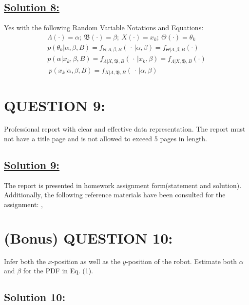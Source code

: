 \documentclass[a4paper,11pt]{article}
\begin{document}
\subsection*{\underline{Solution 8:}}
\label{sec:notation}
Yes with the following Random Variable Notations and Equations: 
 	\begin{eqnarray}
		\Lambda (\cdot) = \alpha;\: \mathfrak{B}(\cdot) = \beta ; \: X(\cdot) = x_k; \: \Theta ( \cdot) = \theta_k \\		
		p(\theta_k | \alpha, \beta, B) = f_{\Theta | \Lambda, \beta, B}(\, \cdot \, | \alpha, \beta) = f_{\Theta | \Lambda, \beta, B}(\cdot)\\
		p(\alpha | x_k, \beta, B) = f_{\Lambda | X, \mathfrak{B}, B}(\, \cdot \, | x_k, \beta) = f_{\Lambda | X, \mathfrak{B}, B}(\cdot) \\\ 
		p(x_k |\alpha, \beta, B) = f_{X | \Lambda, \mathfrak{B}, B}(\, \cdot \, | \alpha, \beta)
	\end{eqnarray}

\section{QUESTION 9:}
Professional report with clear and effective data representation. The report must not have
a title page and is not allowed to exceed 5 pages in length.
\subsection*{\underline{Solution 9:}}
The report is presented in homework assignment form(statement and solution). Additionally, the following reference materials have been consulted for the assignment: \cite{leon2017probability}, \cite{bishop2006pattern}

\section{(Bonus) QUESTION 10:}
Infer both the $x$-position as well as the $y$-position of the robot. Estimate both $\alpha$ and $\beta$ for the PDF in Eq. (1).
\subsection*{Solution 10:}






\newpage
\appendix

\makeatother
\end{document}
